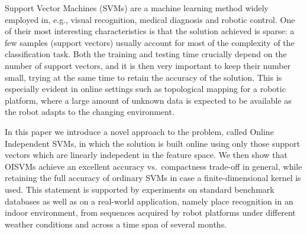 Support Vector Machines (SVMs) are a machine learning method widely
employed in, e.g., visual recognition, medical diagnosis and robotic
control. One of their most interesting characteristics is that the
solution achieved is sparse: a few samples (support vectors) usually
account for most of the complexity of the classification task. Both
the training and testing time crucially depend on the number of
support vectors, and it is then very important to keep their number
small, trying at the same time to retain the accuracy of the
solution. This is especially evident in online settings such as
topological mapping for a robotic platform, where a large amount of
unknown data is expected to be available as the robot adapts to the
changing environment.

In this paper we introduce a novel approach to the problem, called
Online Independent SVMs, in which the solution is built online using
only those support vectors which are linearly indepedent in the
feature space. We then show that OISVMs achieve an excellent accuracy
vs.~compactness trade-off in general, while retaining the full
accuracy of ordinary SVMs in case a finite-dimensional kernel is
used. This statement is supported by experiments on standard benchmark
databases as well as on a real-world application, namely place
recognition in an indoor environment, from sequences acquired by robot
platforms under different weather conditions and across a time span of
several months.
